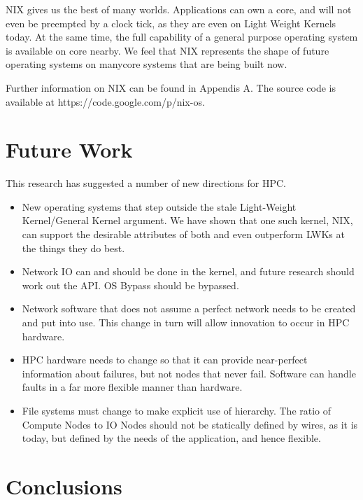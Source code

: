 \documentclass{report}
\begin{document}
NIX gives us the best of many worlds. Applications can own a core, 
and will not even be preempted by a clock tick, as they are even 
on Light Weight Kernels today. At the same time, the full capability 
of a general purpose operating system is available on core nearby. 
We feel that NIX represents the shape of future operating systems
on manycore systems that are being built now. 

Further information on NIX can be found in Appendis A. The source 
code is available at https://code.google.com/p/nix-os. 

\chapter{Future Work}
This research has suggested a number of new directions for HPC. 
\begin{itemize}
\item New operating systems that step outside the stale Light-Weight Kernel/General Kernel
argument. We have shown that one such kernel, NIX, can support the desirable attributes of both
and even outperform LWKs at the things they do best. 
\item Network IO can and should be done in the kernel, and future research should 
work out the API. OS Bypass should be bypassed. 
\item Network software that does not assume a perfect network needs to be created and put into use.
This change in turn will allow innovation to occur in 
HPC hardware. 
\item HPC hardware needs to change so that it can provide near-perfect
information about failures, but not nodes that never fail. Software 
can handle faults in a far more flexible manner than hardware. 
\item File systems must change to make explicit use of hierarchy. The ratio of Compute Nodes to IO Nodes should not be 
statically defined by wires, as it is today, but defined by the needs of the application, and hence flexible. 
\end{itemize}

\chapter{Conclusions}
\end{document}
